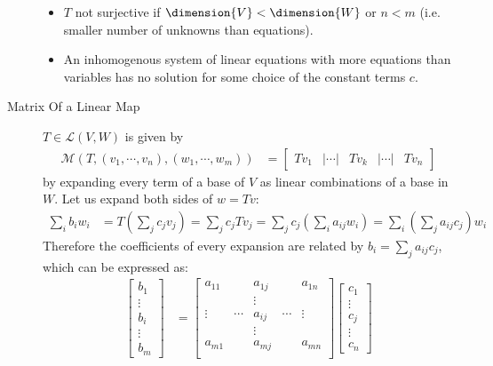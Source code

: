 \begin{description}
\begin{itemize}
  \item $T$ not surjective if $\dimension{V} < \dimension{W}$ or $n<m$ (i.e. smaller number of unknowns than equations).
  \item An inhomogenous system of linear equations with more equations than variables has no solution for some choice of the constant terms $c$.
  \end{itemize}
  \item[Matrix Of a Linear Map\label{itm:D6_matrix}]  $T\in\mathcal{L}(V,W)$ is given by \begin{align*}
  \mathcal{M}(T, (v_1,\cdots, v_n), (w_1, \cdots, w_m)) &=\begin{bmatrix}
  Tv_1 &| \cdots |& Tv_k & |\cdots |& Tv_n 
  \end{bmatrix} 
  \end{align*} by expanding every term of a base of $V$ as linear combinations of a base in $W$. Let us expand both sides of $w = Tv$:
  \begin{align*}
  \sum_i b_i w_i &= T\left(\sum_j c_jv_j\right) = \sum_j c_j T v_j = \sum_j c_j \left(\sum_i a_{ij} w_i\right) = \sum_i \left( \sum_j  a_{ij} c_j\right) w_i 
  \end{align*}
  Therefore the coefficients of every expansion are related by $b_i = \sum_j  a_{ij} c_j$, which can be expressed as:
  \begin{align*}
  \begin{bmatrix}
  b_1 \\
  \vdots \\
  b_i \\
  \vdots \\
  b_m
  \end{bmatrix}
  &= \begin{bmatrix}
  a_{11} &       &a_{1j} &        & a_{1n} \\
         &       &\vdots &        &        \\
  \vdots &\cdots &a_{ij} & \cdots &\vdots  \\
         &       &\vdots &        &        \\
  a_{m1} &       &a_{mj} &        &a_{mn}  \\
  \end{bmatrix}
  \begin{bmatrix}
  c_1 \\
  \vdots \\
  c_j \\
  \vdots \\
  c_n
  \end{bmatrix}

\end{align*}
\end{description}
